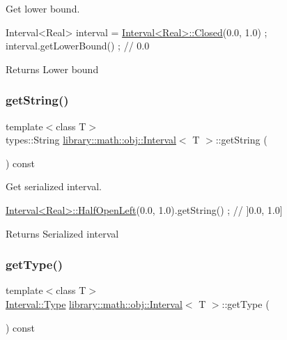 Get lower bound. 


\begin{DoxyCode}
Interval<Real> interval = \hyperlink{classlibrary_1_1math_1_1obj_1_1_interval_aae8bb2b89af450729338d48563def4d7}{Interval<Real>::Closed}(0.0, 1.0) ;
interval.getLowerBound() ; \textcolor{comment}{// 0.0}
\end{DoxyCode}


\begin{DoxyReturn}{Returns}
Lower bound 
\end{DoxyReturn}
\mbox{\label{classlibrary_1_1math_1_1obj_1_1_interval_aedaaa7c1b22246a1bf387e070d17f47f}} 
\subsubsection{\texorpdfstring{get\+String()}{getString()}}
{\footnotesize\ttfamily template$<$class T$>$ \\
types\+::\+String \hyperlink{classlibrary_1_1math_1_1obj_1_1_interval}{library\+::math\+::obj\+::\+Interval}$<$ T $>$\+::get\+String (\begin{DoxyParamCaption}{ }\end{DoxyParamCaption}) const}



Get serialized interval. 


\begin{DoxyCode}
\hyperlink{classlibrary_1_1math_1_1obj_1_1_interval_a7e706c1e5133c731645e7633a9d763bd}{Interval<Real>::HalfOpenLeft}(0.0, 1.0).getString() ; \textcolor{comment}{// ]0.0, 1.0]}
\end{DoxyCode}


\begin{DoxyReturn}{Returns}
Serialized interval 
\end{DoxyReturn}
\mbox{\label{classlibrary_1_1math_1_1obj_1_1_interval_a881ab7e17883b4f1553d7e8ba9cc7656}} 
\subsubsection{\texorpdfstring{get\+Type()}{getType()}}
{\footnotesize\ttfamily template$<$class T$>$ \\
\hyperlink{classlibrary_1_1math_1_1obj_1_1_interval_abc7177f1c446d8273e70c989953667d1}{Interval\+::\+Type} \hyperlink{classlibrary_1_1math_1_1obj_1_1_interval}{library\+::math\+::obj\+::\+Interval}$<$ T $>$\+::get\+Type (\begin{DoxyParamCaption}{ }\end{DoxyParamCaption}) const}



